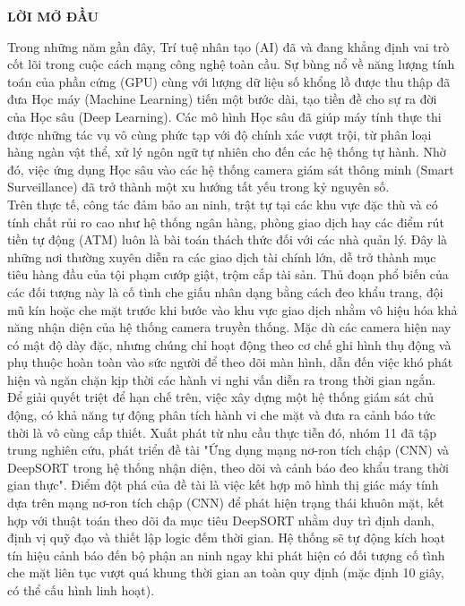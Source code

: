 \documentclass[a4paper,12pt]{article}
\begin{document}
\newpage
{}
\begin{center}
    {\fontsize{16pt}{20pt}\selectfont \textbf{LỜI MỞ ĐẦU}}
\end{center}

\vspace{1cm}
\setlength{\parindent}{1cm} 
\fontsize{13pt}{18pt}\selectfont 

Trong những năm gần đây, Trí tuệ nhân tạo (AI) đã và đang khẳng định vai trò cốt lõi trong cuộc cách mạng công nghệ toàn cầu. Sự bùng nổ về năng lượng tính toán của phần cứng (GPU) cùng với lượng dữ liệu số khổng lồ được thu thập đã đưa Học máy (Machine Learning) tiến một bước dài, tạo tiền đề cho sự ra đời của Học sâu (Deep Learning). Các mô hình Học sâu đã giúp máy tính thực thi được những tác vụ vô cùng phức tạp với độ chính xác vượt trội, từ phân loại hàng ngàn vật thể, xử lý ngôn ngữ tự nhiên cho đến các hệ thống tự hành. Nhờ đó, việc ứng dụng Học sâu vào các hệ thống camera giám sát thông minh (Smart Surveillance) đã trở thành một xu hướng tất yếu trong kỷ nguyên số.\\

Trên thực tế, công tác đảm bảo an ninh, trật tự tại các khu vực đặc thù và có tính chất rủi ro cao như hệ thống ngân hàng, phòng giao dịch hay các điểm rút tiền tự động (ATM) luôn là bài toán thách thức đối với các nhà quản lý. Đây là những nơi thường xuyên diễn ra các giao dịch tài chính lớn, dễ trở thành mục tiêu hàng đầu của tội phạm cướp giật, trộm cắp tài sản. Thủ đoạn phổ biến của các đối tượng này là cố tình che giấu nhân dạng bằng cách đeo khẩu trang, đội mũ kín hoặc che mặt trước khi bước vào khu vực giao dịch nhằm vô hiệu hóa khả năng nhận diện của hệ thống camera truyền thống. Mặc dù các camera hiện nay có mật độ dày đặc, nhưng chúng chỉ hoạt động theo cơ chế ghi hình thụ động và phụ thuộc hoàn toàn vào sức người để theo dõi màn hình, dẫn đến việc khó phát hiện và ngăn chặn kịp thời các hành vi nghi vấn diễn ra trong thời gian ngắn.\\

Để giải quyết triệt để hạn chế trên, việc xây dựng một hệ thống giám sát chủ động, có khả năng tự động phân tích hành vi che mặt và đưa ra cảnh báo tức thời là vô cùng cấp thiết. Xuất phát từ nhu cầu thực tiễn đó, nhóm 11 đã tập trung nghiên cứu, phát triển đề tài "Ứng dụng mạng nơ-ron tích chập (CNN) và DeepSORT trong hệ thống nhận diện, theo dõi và cảnh báo đeo khẩu trang thời gian thực". Điểm đột phá của đề tài là việc kết hợp mô hình thị giác máy tính dựa trên mạng nơ-ron tích chập (CNN) để phát hiện trạng thái khuôn mặt, kết hợp với thuật toán theo dõi đa mục tiêu DeepSORT nhằm duy trì định danh, định vị quỹ đạo và thiết lập logic đếm thời gian. Hệ thống sẽ tự động kích hoạt tín hiệu cảnh báo đến bộ phận an ninh ngay khi phát hiện có đối tượng cố tình che mặt liên tục vượt quá khung thời gian an toàn quy định (mặc định 10 giây, có thể cấu hình linh hoạt).\\
\end{document}
